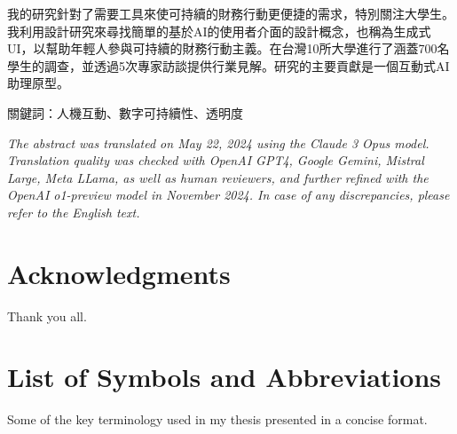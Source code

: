 \documentclass[
  letterpaper,
  DIV=11,
  numbers=noendperiod]{scrartcl}
\begin{document}
我的研究針對了需要工具來使可持續的財務行動更便捷的需求，特別關注大學生。我利用設計研究來尋找簡單的基於AI的使用者介面的設計概念，也稱為生成式UI，以幫助年輕人參與可持續的財務行動主義。在台灣10所大學進行了涵蓋700名學生的調查，並透過5次專家訪談提供行業見解。研究的主要貢獻是一個互動式AI助理原型。

關鍵詞：人機互動、數字可持續性、透明度

\emph{The abstract was translated on May 22, 2024 using the Claude 3
Opus model. Translation quality was checked with OpenAI GPT4, Google
Gemini, Mistral Large, Meta LLama, as well as human reviewers, and
further refined with the OpenAI o1-preview model in November 2024. In
case of any discrepancies, please refer to the English text.}

\newpage

\section{Acknowledgments}\label{acknowledgments}

Thank you all.

\newpage

\tableofcontents

\newpage

\section{List of Symbols and
Abbreviations}\label{list-of-symbols-and-abbreviations}

Some of the key terminology used in my thesis presented in a concise
format.
\end{document}
